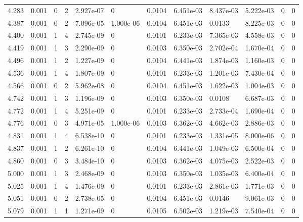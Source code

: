 \documentclass[preview]{standalone}
\begin{document}
{{{\begin{tabular}{L{1.2cm}C{1.2cm} C{0.3cm}C{0.5cm} C{1.4cm}C{1.4cm} C{1.4cm}C{1.4cm} C{1.6cm}C{1.6cm} C{1.6cm}C{1.6cm}}
  4.283  &  0.001  & 0     &  2 &  2.927e-07  & 0  &  0.0104&   6.451e-03& 8.437e-03 & 5.222e-03   &  0 & 0  \\ 
  4.387  &  0.001  & 0     &  2 &  7.096e-05  & 1.000e-06  &  0.0104&   6.451e-03& 0.0133 & 8.225e-03   &  0 & 0  \\ 
  4.400  &  0.001  & 1     &  4 &  2.745e-09  & 0  &  0.0101&   6.233e-03& 7.365e-03 & 4.558e-03   &  0 & 0  \\ 
  4.419  &  0.001  & 1     &  3 &  2.290e-09  & 0  &  0.0103&   6.350e-03& 2.702e-04 & 1.670e-04   &  0 & 0  \\ 
  4.496  &  0.001  & 1     &  2 &  1.227e-09  & 0  &  0.0104&   6.441e-03& 1.874e-03 & 1.160e-03   &  0 & 0  \\ 
  4.536  &  0.001  & 1     &  4 &  1.807e-09  & 0  &  0.0101&   6.233e-03& 1.201e-03 & 7.430e-04   &  0 & 0  \\ 
  4.566  &  0.001  & 0     &  2 &  5.962e-08  & 0  &  0.0104&   6.451e-03& 1.622e-03 & 1.004e-03   &  0 & 0  \\ 
  4.742  &  0.001  & 1     &  3 &  1.196e-09  & 0  &  0.0103&   6.350e-03& 0.0108 & 6.687e-03   &  0 & 0  \\ 
  4.772  &  0.001  & 1     &  4 &  5.251e-09  & 0  &  0.0101&   6.233e-03& 2.733e-04 & 1.690e-04   &  0 & 0  \\ 
  4.776  &  0.001  & 0     &  3 &  4.971e-05  & 1.000e-06  &  0.0103&   6.362e-03& 4.662e-03 & 2.886e-03   &  0 & 0  \\ 
  4.831  &  0.001  & 1     &  4 &  6.538e-10  & 0  &  0.0101&   6.233e-03& 1.331e-05 & 8.000e-06   &  0 & 0  \\ 
  4.837  &  0.001  & 1     &  2 &  6.261e-10  & 0  &  0.0104&   6.441e-03& 1.049e-03 & 6.500e-04   &  0 & 0  \\ 
  4.860  &  0.001  & 0     &  3 &  3.484e-10  & 0  &  0.0103&   6.362e-03& 4.075e-03 & 2.522e-03   &  0 & 0  \\ 
  5.000  &  0.001  & 1     &  3 &  2.468e-09  & 0  &  0.0103&   6.350e-03& 1.035e-03 & 6.400e-04   &  0 & 0  \\ 
  5.025  &  0.001  & 1     &  4 &  1.476e-09  & 0  &  0.0101&   6.233e-03& 2.861e-03 & 1.771e-03   &  0 & 0  \\ 
  5.051  &  0.001  & 0     &  2 &  2.738e-05  & 0  &  0.0104&   6.451e-03& 0.0146 & 9.061e-03   &  0 & 0  \\ 
  5.079  &  0.001  & 1     &  1 &  1.271e-09  & 0  &  0.0105&   6.502e-03& 1.219e-03 & 7.540e-04   &  0 & 0  \\ 

\end{tabular}}}}
\end{document}
